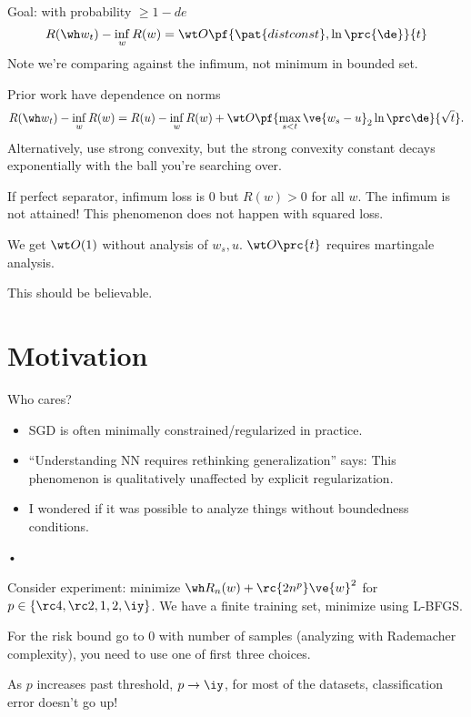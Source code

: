 Goal: with probability $\ge 1-de$ 
$$
R(\wh w_t ) -\inf_w R(w) = \wt O\pf{\pat{dist const}, \ln\prc{\de}}{t}
$$
Note we're comparing against the infimum, not minimum in bounded set.

Prior work have dependence on norms
$$
R(\wh w_t) - \inf_w R(w) = R(u) - \inf_w R(w) + \wt O\pf{\max_{s<t} \ve{w_s-u}_2\ln \prc\de}{\sqrt t}.
$$
Alternatively, use strong convexity, but the strong convexity constant decays exponentially with the  ball you're searching over.

If perfect separator, infimum loss is 0 but $R(w)>0$ for all $w$. The infimum is not attained!
This phenomenon does not happen with squared loss.


We get $\wt O(1)$ without analysis of $w_s,u$. $\wt O\prc{t}$ requires martingale analysis.

This should be believable.

\section{Motivation}

Who cares?

\begin{itemize}
\item
SGD is often minimally constrained/regularized in practice.
\item
``Understanding NN requires rethinking generalization'' says: This phenomenon is qualitatively unaffected by explicit regularization.
\item
I wondered if it was possible to analyze things without boundedness conditions. 

\end{itemize}•

Consider experiment: minimize $\wh R_n(w) + \rc{2n^p}\ve{w}^2$ for $p\in \{\rc 4, \rc 2, 1, 2, \iy\}$. 
We have a finite training set, minimize using L-BFGS.

For the risk bound go to 0 with number of samples (analyzing with Rademacher complexity), you need to use one of first three choices.

As $p$ increases past threshold, $p\to \iy$, %
for most of the datasets, classification error doesn't go up!

%

